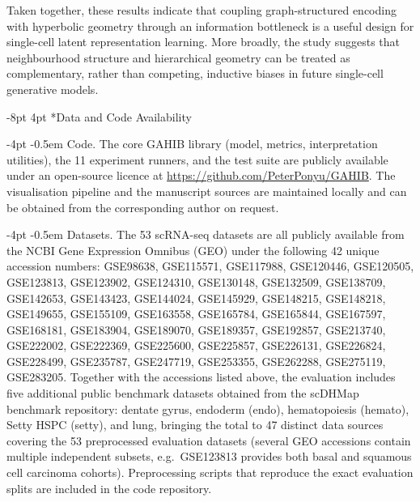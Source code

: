 \documentclass[preprint,12pt]{elsarticle}
\makeatletter
\renewcommand\section{\@startsection{section}{1}{\z@}%
  {-8pt \@plus -2pt \@minus -2pt}%
  {4pt \@plus 1pt \@minus 1pt}%
  {\normalfont\Large\bfseries}}
\renewcommand\paragraph{\@startsection{paragraph}{4}{\z@}%
  {-4pt \@plus -1pt \@minus -1pt}%
  {-0.5em}%
  {\normalfont\normalsize\bfseries}}
\makeatother
\begin{document}
Taken together, these results indicate that coupling graph-structured
encoding with hyperbolic geometry through an information bottleneck is
a useful design for single-cell latent representation learning. More
broadly, the study suggests that neighbourhood structure and
hierarchical geometry can be treated as complementary, rather than
competing, inductive biases in future single-cell generative models.


\section*{Data and Code Availability}

\paragraph{Code.}
The core GAHIB library (model, metrics, interpretation utilities),
the 11 experiment runners, and the test suite are publicly available
under an open-source licence at
\url{https://github.com/PeterPonyu/GAHIB}. The visualisation pipeline
and the manuscript sources are maintained locally and can be obtained
from the corresponding author on request.

\paragraph{Datasets.}
The 53 scRNA-seq datasets are all publicly available from the NCBI
Gene Expression Omnibus (GEO) under the following 42 unique
accession numbers:
GSE98638, GSE115571, GSE117988, GSE120446, GSE120505, GSE123813,
GSE123902, GSE124310, GSE130148, GSE132509, GSE138709, GSE142653,
GSE143423, GSE144024, GSE145929, GSE148215, GSE148218, GSE149655,
GSE155109, GSE163558, GSE165784, GSE165844, GSE167597, GSE168181,
GSE183904, GSE189070, GSE189357, GSE192857, GSE213740, GSE222002,
GSE222369, GSE225600, GSE225857, GSE226131, GSE226824, GSE228499,
GSE235787, GSE247719, GSE253355, GSE262288, GSE275119, GSE283205.
Together with the accessions listed above, the evaluation includes
five additional public benchmark datasets obtained from the
scDHMap benchmark repository: dentate gyrus, endoderm (endo),
hematopoiesis (hemato), Setty HSPC (setty), and lung, bringing the
total to 47 distinct data sources covering the 53 preprocessed
evaluation datasets (several GEO accessions contain multiple
independent subsets, e.g.\ GSE123813 provides both basal and
squamous cell carcinoma cohorts).
Preprocessing scripts that reproduce the exact evaluation splits are
included in the code repository.
\end{document}
